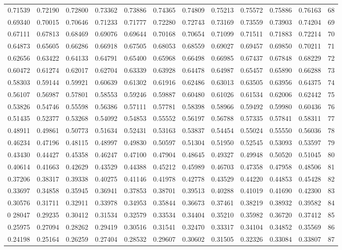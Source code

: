 \begin{center}
\begin{tabular}{|rrrrrrrrrrr|r|}
0.71539&0.72190&0.72800&0.73362&0.73886&0.74365&0.74809&0.75213&0.75572&0.75886&0.76163&68\\
0.69340&0.70015&0.70646&0.71233&0.71777&0.72280&0.72743&0.73169&0.73559&0.73903&0.74204&69\\[5pt]
0.67111&0.67813&0.68469&0.69076&0.69644&0.70168&0.70654&0.71099&0.71511&0.71883&0.72214&70\\
0.64873&0.65605&0.66286&0.66918&0.67505&0.68053&0.68559&0.69027&0.69457&0.69850&0.70211&71\\
0.62656&0.63422&0.64133&0.64791&0.65400&0.65968&0.66498&0.66985&0.67437&0.67848&0.68229&72\\
0.60472&0.61274&0.62017&0.62704&0.63339&0.63928&0.64478&0.64987&0.65457&0.65890&0.66288&73\\
0.58303&0.59144&0.59921&0.60639&0.61302&0.61916&0.62486&0.63013&0.63505&0.63956&0.64375&74\\[5pt]
0.56107&0.56987&0.57801&0.58553&0.59246&0.59887&0.60480&0.61026&0.61534&0.62006&0.62442&75\\
0.53826&0.54746&0.55598&0.56386&0.57111&0.57781&0.58398&0.58966&0.59492&0.59980&0.60436&76\\
0.51435&0.52377&0.53268&0.54092&0.54853&0.55552&0.56197&0.56788&0.57335&0.57841&0.58311&77\\
0.48911&0.49861&0.50773&0.51634&0.52431&0.53163&0.53837&0.54454&0.55024&0.55550&0.56036&78\\
0.46234&0.47196&0.48115&0.48997&0.49830&0.50597&0.51304&0.51950&0.52545&0.53093&0.53597&79\\[5pt]
0.43430&0.44427&0.45358&0.46247&0.47100&0.47904&0.48645&0.49327&0.49948&0.50520&0.51045&80\\
0.40614&0.41663&0.42629&0.43529&0.44388&0.45212&0.45989&0.46703&0.47358&0.47958&0.48506&81\\
0.37206&0.38317&0.39338&0.40275&0.41146&0.41978&0.42778&0.43529&0.44220&0.44853&0.45428&82\\
0.33697&0.34858&0.35945&0.36941&0.37853&0.38701&0.39513&0.40288&0.41019&0.41690&0.42300&83\\
0.30576&0.31711&0.32911&0.33978&0.34953&0.35844&0.36673&0.37461&0.38219&0.38932&0.39582&84\\[5pt]
0 28047&0.29235&0.30412&0.31534&0.32579&0.33534&0.34404&0.35210&0.35982&0.36720&0.37412&85\\
0.25975&0.27094&0.28262&0.29419&0.30516&0.31541&0.32470&0.33317&0.34104&0.34852&0.35569&86\\
0.24198&0.25164&0.26259&0.27404&0.28532&0.29607&0.30602&0.31505&0.32326&0.33084&0.33807&87\\

\end{tabular}
\end{center}
